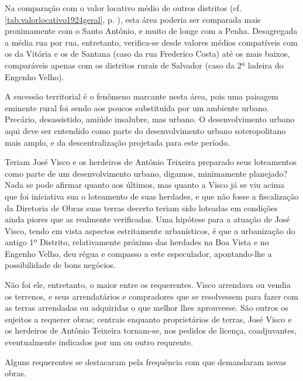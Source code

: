 Na comparação com o valor locativo médio de outros distritos (cf. \autoref{tab:valorlocativo1924geral}, p. \pageref{tab:valorlocativo1924geral}), esta área poderia ser comparada mais proximamente com o Santo Antônio, e muito de longe com a Penha. Desagregada a média rua por rua, entretanto, verifica-se desde valores médios compatíveis com os da Vitória e os de Santana (caso da rua Frederico Costa) até os mais baixos, comparáveis apenas com os distritos rurais de Salvador (caso da 2ª ladeira do Engenho Velho).


A sucessão territorial é o fenômeno marcante nesta área, pois uma paisagem eminente rural foi sendo aos poucos substituída por um ambiente urbano. Precário, desassistido, amiúde insalubre, mas urbano. O desenvolvimento urbano aqui deve ser entendido como parte do desenvolvimento urbano soteropolitano mais amplo, e da descentralização projetada para este período.


Teriam José Visco e os herdeiros de Antônio Teixeira preparado seus loteamentos como parte de um desenvolvimento urbano, digamos, minimamente planejado? Nada se pode afirmar quanto aos últimos, mas quanto a Visco já se viu acima que foi iniciativa sua o loteamento de suas herdades, e que não fosse a fiscalização da Diretoria de Obras suas terras decerto teriam sido loteadas em condições ainda piores que as realmente verificadas. Uma hipótese para a atuação de José Visco, tendo em vista aspectos estritamente urbanísticos, é que a urbanização do antigo 1º Distrito, relativamente próximo das herdades na Boa Vista e no Engenho Velho, deu régua e compasso a este especulador, apontando-lhe a possibilidade de bons negócios.


Não foi ele, entretanto, o maior entre os requerentes. Visco arrendava ou vendia os terrenos, e seus arrendatários e compradores que se resolvessem para fazer com as terras arrendadas ou adquiridas o que melhor lhes aprouvesse. São outros os sujeitos a requerer obras; centrais enquanto proprietários de terras, José Visco e os herdeiros de Antônio Teixeira tornam-se, nos pedidos de licença, coadjuvantes, eventualmente indicados por um ou outro requrente.

Alguns requerentes se destacaram pela frequência com que demandaram novas obras.

